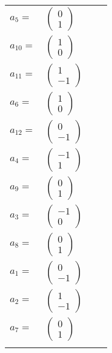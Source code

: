 \documentclass[1p]{elsarticle_modified}
\theoremstyle{definition}
\begin{document}
\begin{tabular}{m{7pt} m{180pt} m{7pt} m{180pt} }
\flushright $a_{5}=$&$\begin{pmatrix}0\\1\end{pmatrix}$ \\
\flushright $a_{10}=$&$\begin{pmatrix}1\\0\end{pmatrix}$ \\
\flushright $a_{11}=$&$\begin{pmatrix}1\\-1\end{pmatrix}$ \\
\flushright $a_{6}=$&$\begin{pmatrix}1\\0\end{pmatrix}$ \\
\flushright $a_{12}=$&$\begin{pmatrix}0\\-1\end{pmatrix}$ \\
\flushright $a_{4}=$&$\begin{pmatrix}-1\\1\end{pmatrix}$ \\
\flushright $a_{9}=$&$\begin{pmatrix}0\\1\end{pmatrix}$ \\
\flushright $a_{3}=$&$\begin{pmatrix}-1\\0\end{pmatrix}$ \\
\flushright $a_{8}=$&$\begin{pmatrix}0\\1\end{pmatrix}$ \\
\flushright $a_{1}=$&$\begin{pmatrix}0\\-1\end{pmatrix}$ \\
\flushright $a_{2}=$&$\begin{pmatrix}1\\-1\end{pmatrix}$ \\
\flushright $a_{7}=$&$\begin{pmatrix}0\\1\end{pmatrix}$\\&\end{tabular}
\end{document}
